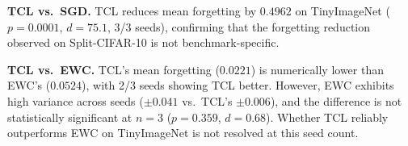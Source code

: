\textbf{TCL vs.\ SGD.} TCL reduces mean forgetting by $0.4962$ on TinyImageNet
($p = 0.0001$, $d = 75.1$, 3/3 seeds), confirming that the forgetting reduction
observed on Split-CIFAR-10 is not benchmark-specific.

\textbf{TCL vs.\ EWC.} TCL's mean forgetting ($0.0221$) is numerically lower
than EWC's ($0.0524$), with 2/3 seeds showing TCL better. However, EWC exhibits
high variance across seeds ($\pm 0.041$ vs.\ TCL's $\pm 0.006$), and the
difference is not statistically significant at $n = 3$ ($p = 0.359$, $d = 0.68$).
Whether TCL reliably outperforms EWC on TinyImageNet is not resolved at this
seed count.
